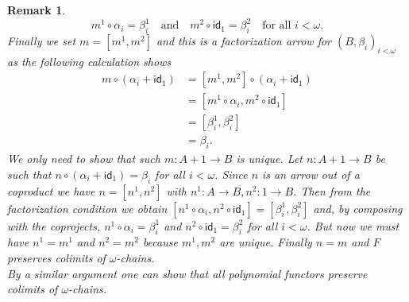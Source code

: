 \documentclass[letterpaper, 11pt, oneside]{memoir}
\theoremstyle{myteo}
\newtheorem{remark}[theorem]{Remark}
\numberwithin{equation}{section}
\newcommand{\id}{\textsf{id}}
\begin{document}
\begin{remark}
  \begin{equation*}
    m^1 \circ \alpha_i = \beta_i^1 \quad \text{and} \quad m^2 \circ \id_1 = \beta_i^2 \quad \text{for all \(i<\omega\)}.
  \end{equation*}
  Finally we set \(m = [m^1, m^2]\) and this is a factorization arrow for \((B, \beta_i)_{i<\omega}\) as the following calculation shows
  \begin{align*}
    m \circ (\alpha_i + \id_1) &= [m^1, m^2] \circ (\alpha_i + \id_1)\\
                      &= [m^1 \circ \alpha_i, m^2 \circ \id_1]\\
                      &= [\beta_i^1, \beta_i^2]\\
                      &= \beta_i.
  \end{align*}
  We only need to show that such \(m:A + 1 \to B\) is unique.
  Let \(n: A + 1 \to B\) be such that \(n \circ (\alpha_i + \id_1) = \beta_i\) for all \(i<\omega\).
  Since \(n\) is an arrow out of a coproduct we have \(n = [n^1, n^2]\) with \(n^1:A \to B, n^2:1 \to B\).
  Then from the factorization condition we obtain \([n^1 \circ \alpha_i, n^2 \circ \id_1] = [\beta_i^1, \beta_i^2]\) and, by composing with the coprojects, \(n^1 \circ \alpha_i = \beta_i^1\) and \(n^2 \circ \id_1 = \beta_i^2\) for all \(i < \omega\).
  But now we must have \(n^1 = m^1\) and \(n^2 = m^2\) because \(m^1, m^2\) are unique.
  Finally \(n = m\) and \(F\) preserves colimits of \(\omega\)-chains.\\

  By a similar argument one can show that all polynomial functors preserve colimits of \(\omega\)-chains.
\end{remark}
\end{document}
